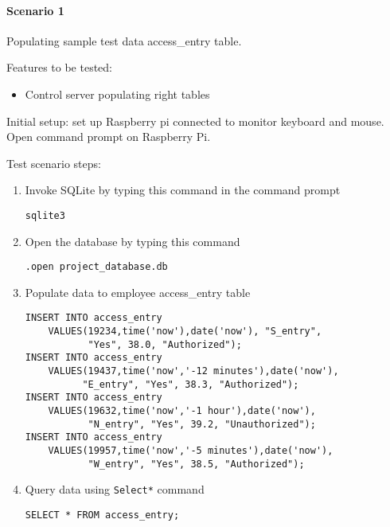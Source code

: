 \paragraph{Scenario 1}
Populating sample test data access\_entry table.

\noindent
Features to be tested:
\begin{itemize}
    \item Control server populating right tables
\end{itemize}

\noindent
Initial setup: set up Raspberry pi connected to monitor keyboard and mouse.
Open command prompt on Raspberry Pi.

\noindent
Test scenario steps:
\begin{enumerate}
    \item Invoke SQLite by typing this command in the command prompt
\begin{lstlisting}
sqlite3
\end{lstlisting}
    \item Open the database by typing this command 
\begin{listing}[H]
\begin{verbatim}
.open project_database.db
\end{verbatim}
\end{listing}
    \item Populate data to employee access\_entry table
\begin{listing}[H]
\begin{verbatim}
INSERT INTO access_entry
    VALUES(19234,time('now'),date('now'), "S_entry",
           "Yes", 38.0, "Authorized");
INSERT INTO access_entry
    VALUES(19437,time('now','-12 minutes'),date('now'),
          "E_entry", "Yes", 38.3, "Authorized");
INSERT INTO access_entry
    VALUES(19632,time('now','-1 hour'),date('now'),
           "N_entry", "Yes", 39.2, "Unauthorized");
INSERT INTO access_entry
    VALUES(19957,time('now','-5 minutes'),date('now'),
           "W_entry", "Yes", 38.5, "Authorized");
\end{verbatim}
\end{listing}
    \item Query data using \lstinline{Select*} command
\begin{listing}[H]
\begin{verbatim}
SELECT * FROM access_entry;
\end{verbatim}
\end{listing}
\end{enumerate}

